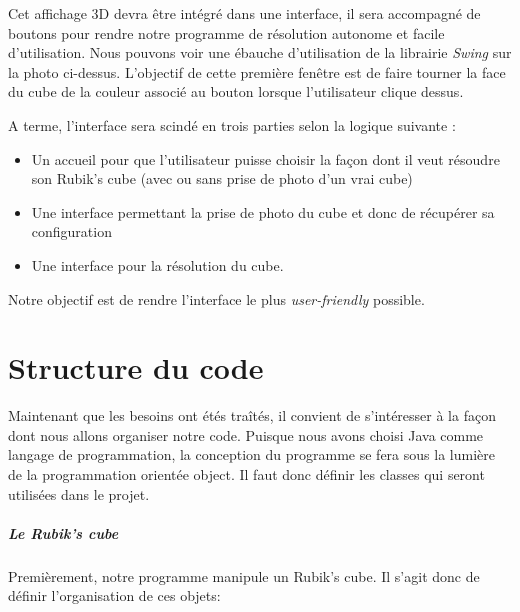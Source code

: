 \documentclass[a4paper]{report}
\begin{document}
Cet affichage 3D devra être intégré dans une interface, il sera accompagné de boutons pour rendre notre programme de résolution autonome et facile d'utilisation. Nous pouvons voir une ébauche d'utilisation de la librairie \textit{Swing} sur la photo ci-dessus. L'objectif de cette première fenêtre est de faire tourner la face du cube de la couleur associé au bouton lorsque l'utilisateur clique dessus.

A terme, l'interface sera scindé en trois parties selon la logique suivante :

\begin{itemize}
    \item Un accueil pour que l'utilisateur puisse choisir la façon dont il veut résoudre son Rubik's cube (avec ou sans prise de photo d'un vrai cube)
    \item Une interface permettant la prise de photo du cube et donc de récupérer sa configuration 
    \item Une interface pour la résolution du cube.
\end{itemize}
Notre objectif est de rendre l'interface le plus \textit{user-friendly} possible.

\chapter{Structure du code}

Maintenant que les besoins ont étés traîtés, il convient de s'intéresser à la façon dont nous allons organiser notre code. Puisque nous avons choisi Java comme langage de programmation, la conception du programme se fera sous la lumière de la programmation orientée object. Il faut donc définir les classes qui seront utilisées dans le projet.

\paragraph{Le Rubik's cube} Premièrement, notre programme manipule un Rubik's cube. Il s'agit donc de définir l'organisation de ces objets:

\begin{center}
\end{center}
\end{document}

